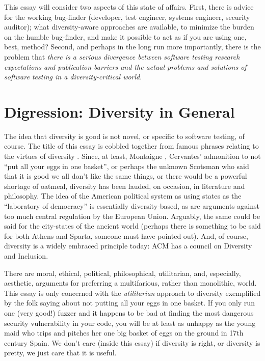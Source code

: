 \documentclass[sigplan]{acmart}
\begin{document}
This essay will consider two aspects of this state of affairs.  First,
there is advice for the working bug-finder (developer, test engineer, systems
engineer, security auditor); what diversity-aware approaches are
available, to minimize the burden on the humble bug-finder, and make
it possible to act as if you are using one, best, method?  Second, and
perhaps in the long run 
more importantly, there is the problem that \emph{there is a serious
divergence between software testing research expectations and
publication barriers and the actual problems and solutions of software testing in a
diversity-critical world}.

\section{Digression: Diversity in General}

The idea that diversity is good is not novel, or specific to software
testing, of course.  The title of this essay is cobbled together from
famous phrases relating to the virtues of diversity \cite{chesterton,mao}.  Since, at least,
Montaigne \cite{montaigne}, Cervantes' \cite{cervantes} admonition to not ``put all your eggs in one
basket'', or perhaps the unknown Scotsman who said that it is good we all
don't like the same things, or there would be a powerful shortage of
oatmeal, diversity has been lauded, on occasion, in literature and
philosophy.  The idea of the American political system as using states
as the ``laboratory of democracy'' is essentially diversity-based, as
are arguments against too much central regulation by the European
Union.  Arguably, the same could be said for the city-states of the
ancient world (perhaps there is something to be said for both Athens
and Sparta, someone must have pointed out).  And, of course, diversity
is a widely embraced principle today: ACM has a council on Diversity
and Inclusion.

There are moral, ethical,
political, philosophical, utilitarian, and, especially,
aesthetic, arguments for preferring a multifarious, rather than
monolithic, world.  This essay is only concerned with the \emph{utilitarian}
approach to diversity exemplified by the folk saying about not putting
all your eggs in one basket.  If you only run one (very good!) fuzzer
and it happens to be bad at finding the most dangerous security
vulnerability in your code, you will be at least as unhappy as the young maid
who trips and pitches her one big basket of eggs on the ground in 17th
century Spain.  We don't care (inside this essay) if diversity is right, or
diversity is pretty, we just care that it is useful.
\end{document}

